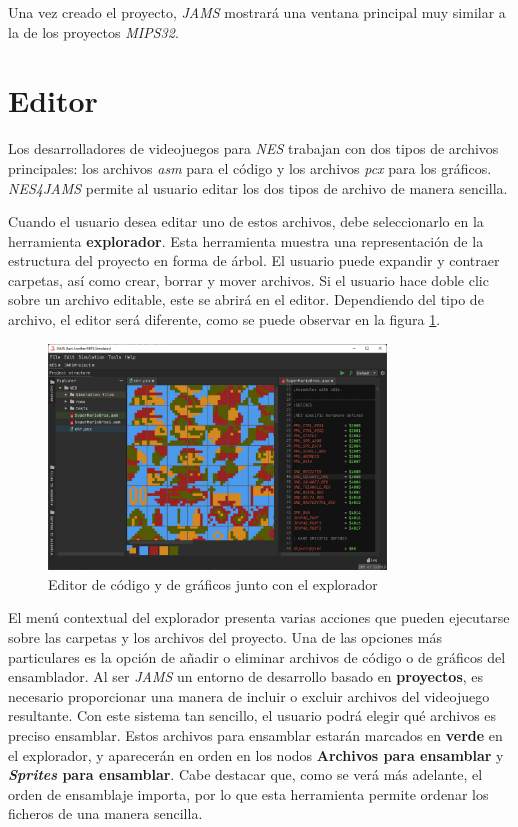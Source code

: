 Una vez creado el proyecto, \textit{JAMS} mostrará una ventana
principal muy similar a la de los proyectos \textit{MIPS32}.


\section{Editor}\label{sec:editor}

Los desarrolladores de videojuegos para \textit{NES} trabajan con
dos tipos de archivos principales: los archivos \textit{asm}
para el código y los archivos \textit{pcx} para los gráficos.
\textit{NES4JAMS} permite al usuario editar los dos tipos de archivo
de manera sencilla.

Cuando el usuario desea editar uno de estos archivos,
debe seleccionarlo en la herramienta \textbf{explorador}.
Esta herramienta muestra una representación de la
estructura del proyecto en forma de árbol.
El usuario puede expandir y contraer carpetas, así como crear,
borrar y mover archivos.
Si el usuario hace doble clic sobre un archivo editable, este se abrirá
en el editor.
Dependiendo del tipo de archivo, el editor será diferente,
como se puede observar en la figura \ref{fig:nes-editor}.

\begin{figure}[h]
    \centering
    \includegraphics[width=0.8\textwidth]{images/nes/nes-editor}
    \caption{Editor de código y de gráficos junto con el explorador}
    \label{fig:nes-editor}
\end{figure}

El menú contextual del explorador presenta varias acciones que
pueden ejecutarse sobre las carpetas y los archivos
del proyecto.
Una de las opciones más particulares es la opción de añadir o eliminar
archivos de código o de gráficos del ensamblador.
Al ser \textit{JAMS} un entorno de desarrollo basado en \textbf{proyectos},
es necesario proporcionar una manera de incluir o excluir archivos del
videojuego resultante.
Con este sistema tan sencillo, el usuario podrá elegir qué archivos es preciso ensamblar.
Estos archivos para ensamblar estarán marcados en \textbf{verde} en el explorador,
y aparecerán en orden en los nodos \textbf{Archivos para ensamblar} y
\textbf{\textit{Sprites} para ensamblar}.
Cabe destacar que, como se verá más adelante, el orden de ensamblaje
importa, por lo que esta herramienta permite ordenar los ficheros de una manera sencilla.

